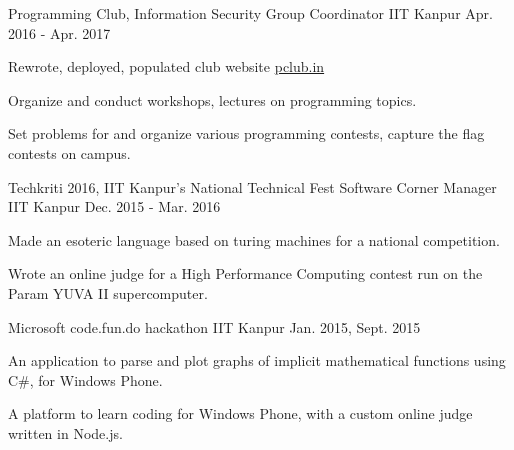 


\begin{cventries}

  \extraentry
  {Programming Club, Information Security Group}
  {Coordinator}
  {IIT Kanpur}
  {Apr. 2016 - Apr. 2017}
  {
    \begin{cvitems}
    \item Rewrote, deployed, populated club website \href{http://pclub.in}{pclub.in}
    \item Organize and conduct workshops, lectures on programming topics.
    \item Set problems for and organize various programming contests,
      capture the flag contests on campus.
    \end{cvitems}
  }

  \extraentry
  {Techkriti 2016, IIT Kanpur's National Technical Fest}
  {Software Corner Manager}
  {IIT Kanpur}
  {Dec. 2015 - Mar. 2016}
  {
    \begin{cvitems}
    \item Made an esoteric language based on turing machines for a
      national competition.
    \item Wrote an online judge for a High Performance Computing
      contest run on the Param YUVA II supercomputer.
    \end{cvitems}
  }

  {Microsoft code.fun.do hackathon}
  {IIT Kanpur}
  {Jan. 2015, Sept. 2015}
  {
    \begin{cvitems}
    \item An application to parse and plot graphs of implicit
      mathematical functions using C\#, for Windows Phone.
    \item A platform to learn coding for Windows Phone, with a
      custom online judge written in Node.js.
    \end{cvitems}
  }

\end{cventries}

